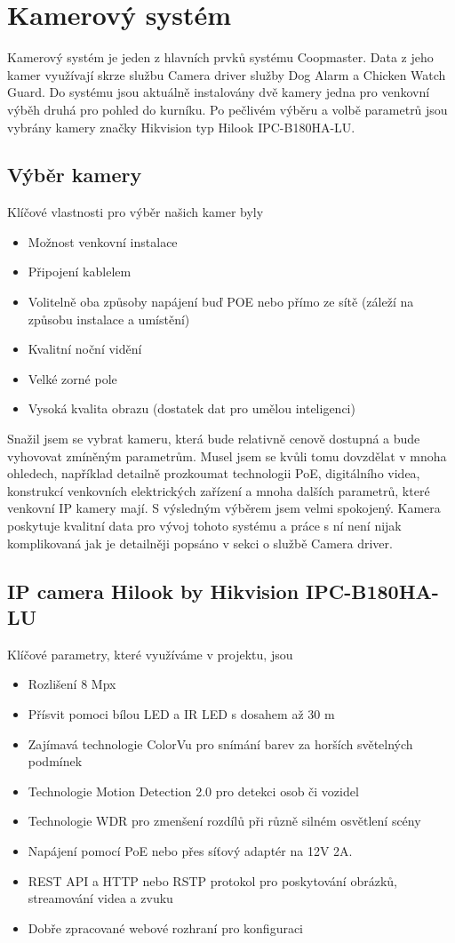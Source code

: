 \section{Kamerový systém}\label{sec:kamerovy-system}
Kamerový systém je jeden z hlavních prvků systému Coopmaster.
Data z jeho kamer využívají skrze službu Camera driver služby Dog Alarm a Chicken Watch Guard.
Do systému jsou aktuálně instalovány dvě kamery jedna pro venkovní výběh druhá pro pohled do kurníku.
Po pečlivém výběru a volbě parametrů jsou vybrány kamery značky Hikvision typ Hilook IPC-B180HA-LU.

\subsection*{Výběr kamery}
Klíčové vlastnosti pro výběr našich kamer byly
\begin{itemize}
    \item Možnost venkovní instalace
    \item Připojení kablelem
    \item Volitelně oba způsoby napájení buď POE nebo přímo ze sítě (záleží na způsobu instalace a umístění)
    \item Kvalitní noční vidění
    \item Velké zorné pole
    \item Vysoká kvalita obrazu (dostatek dat pro umělou inteligenci)
\end{itemize}
Snažil jsem se vybrat kameru, která bude relativně cenově dostupná a bude vyhovovat zmíněným parametrům.
Musel jsem se kvůli tomu dovzdělat v mnoha ohledech, například detailně prozkoumat technologii PoE, digitálního videa, konstrukcí venkovních elektrických zařízení a mnoha dalších parametrů, které venkovní IP kamery mají.
S výsledným výběrem jsem velmi spokojený.
Kamera poskytuje kvalitní data pro vývoj tohoto systému a práce s ní není nijak komplikovaná jak je detailněji popsáno v sekci o službě Camera driver.

\subsection*{IP camera Hilook by Hikvision IPC-B180HA-LU}
Klíčové parametry, které využíváme v projektu, jsou
\begin{itemize}
    \item Rozlišení 8 Mpx
    \item Přísvit pomoci bílou LED a IR LED s dosahem až 30 m
    \item Zajímavá technologie ColorVu pro snímání barev za horších světelných podmínek
    \item Technologie Motion Detection 2.0 pro detekci osob či vozidel
    \item Technologie WDR pro zmenšení rozdílů při různě silném osvětlení scény
    \item Napájení pomocí PoE nebo přes síťový adaptér na 12V 2A.
    \item REST API a HTTP nebo RSTP protokol pro poskytování obrázků, streamování videa a zvuku
    \item Dobře zpracované webové rozhraní pro konfiguraci
\end{itemize}

%
%
%
